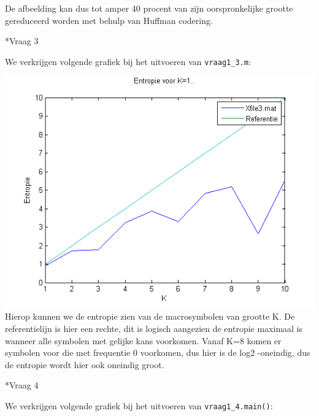 \documentclass[]{article}
\begin{document}
\begin{section}
\begin{subsection}
        De afbeelding kan dus tot amper 40 procent van zijn
        oorspronkelijke grootte gereduceerd worden met behulp van
        Huffman codering.

    \end{subsection}
    
    \begin{subsection}*{Vraag 3}

        We verkrijgen volgende grafiek bij het uitvoeren van
        \texttt{vraag1\_3.m}:

        \includegraphics{vraag1_3.png}
		Hierop kunnen we de entropie zien van de macrosymbolen van grootte K. De referentielijn is hier een rechte, dit is logisch aangezien de entropie maximaal is wanneer alle symbolen met gelijke kans voorkomen.
		Vanaf K=8 komen er symbolen voor die met frequentie 0 voorkomen, dus hier is de log2 -oneindig, dus de entropie wordt hier ook oneindig groot.

    \end{subsection}

    \begin{subsection}*{Vraag 4}
	
        We verkrijgen volgende grafiek bij het uitvoeren van
        \texttt{vraag1\_4.main()}:


\end{subsection}
\end{section}
\end{document}
